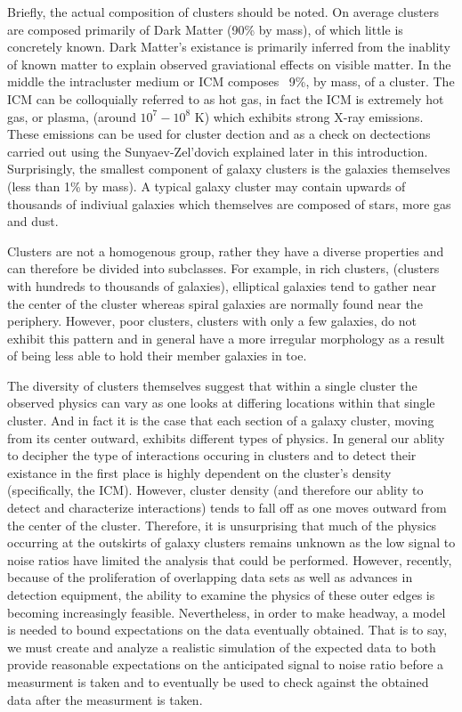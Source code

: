 \documentclass[12pt]{article} %
\begin{document}
Briefly, the actual composition of clusters should be noted. On average clusters are composed primarily of Dark Matter (90\% by mass), of which little is concretely known. Dark Matter's existance is primarily inferred from the inablity of known matter to explain observed graviational effects on visible matter.  In the middle the intracluster medium or ICM composes ~9\%, by mass, of a cluster. The ICM can be colloquially referred to as hot gas, in fact the ICM is extremely hot gas, or plasma, (around $10^{7} - 10^{8}$ K) which exhibits strong X-ray emissions. These emissions can be used for cluster dection and as a check on dectections carried out using the Sunyaev-Zel'dovich explained later in this introduction. Surprisingly, the smallest component of galaxy clusters is the galaxies themselves (less than 1\% by mass). A typical galaxy cluster may contain upwards of thousands of indiviual galaxies which themselves are composed of stars, more gas and dust. 

Clusters are not a homogenous group, rather they have a diverse properties and can therefore be divided into subclasses. For example, in rich clusters, (clusters with hundreds to thousands of galaxies), elliptical galaxies tend to gather near the center of the cluster whereas spiral galaxies are normally found near the periphery. However, poor clusters, clusters with only a few galaxies, do not exhibit this pattern and in general have a more irregular morphology as a result of being less able to hold their member galaxies in toe. 

The diversity of clusters themselves suggest that within a single cluster the observed physics can vary as one looks at differing locations within that single cluster. And in fact it is the case that each section of a galaxy cluster, moving from its center outward, exhibits different types of physics. In general our ablity to decipher the type of interactions occuring in clusters and to detect their existance in the first place is highly dependent on the cluster's density (specifically, the ICM). However, cluster density (and therefore our ablity to detect and characterize interactions) tends to fall off as one moves outward from the center of the cluster. Therefore, it is unsurprising that much of the physics occurring at the outskirts of galaxy clusters remains unknown as the low signal to noise ratios have limited the analysis that could be performed. However, recently, because of the proliferation of overlapping data sets as well as advances in detection equipment, the ability to examine the physics of these outer edges is becoming increasingly feasible. Nevertheless, in order to make headway, a model is needed to bound expectations on the data eventually obtained. That is to say, we must create and analyze a realistic simulation of the expected data to both provide reasonable expectations on the anticipated signal to noise ratio before a measurment is taken  and to eventually be used to check against the obtained data after the measurment is taken. 
\end{document}
